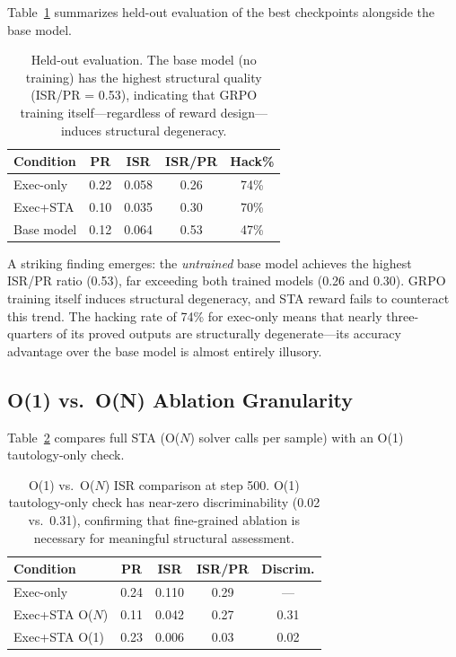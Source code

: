 \documentclass[11pt,a4paper]{article}
\begin{document}
Table~\ref{tab:held-out} summarizes held-out evaluation of the best checkpoints alongside the base model.

\begin{table}[t]
\centering
\small
\begin{tabular}{lcccc}
\toprule
\textbf{Condition} & \textbf{PR} & \textbf{ISR} & \textbf{ISR/PR} & \textbf{Hack\%} \\
\midrule
Exec-only    & 0.22 & 0.058 & 0.26 & 74\% \\
Exec+STA     & 0.10 & 0.035 & 0.30 & 70\% \\
Base model   & 0.12 & 0.064 & 0.53 & 47\% \\
\bottomrule
\end{tabular}
\caption{Held-out evaluation. The base model (no training) has the highest structural quality (ISR/PR = 0.53), indicating that GRPO training itself---regardless of reward design---induces structural degeneracy.}
\label{tab:held-out}
\end{table}

A striking finding emerges: the \emph{untrained} base model achieves the highest ISR/PR ratio (0.53), far exceeding both trained models (0.26 and 0.30).
GRPO training itself induces structural degeneracy, and STA reward fails to counteract this trend.
The hacking rate of 74\% for exec-only means that nearly three-quarters of its proved outputs are structurally degenerate---its accuracy advantage over the base model is almost entirely illusory.

\subsection{O(1) vs.\ O(N) Ablation Granularity}
\label{sec:o1-on}

Table~\ref{tab:o1-on} compares full STA (O($N$) solver calls per sample) with an O(1) tautology-only check.

\begin{table}[t]
\centering
\small
\begin{tabular}{lcccc}
\toprule
\textbf{Condition} & \textbf{PR} & \textbf{ISR} & \textbf{ISR/PR} & \textbf{Discrim.} \\
\midrule
Exec-only      & 0.24 & 0.110 & 0.29 & --- \\
Exec+STA O($N$)& 0.11 & 0.042 & 0.27 & 0.31 \\
Exec+STA O(1)  & 0.23 & 0.006 & 0.03 & 0.02 \\
\bottomrule
\end{tabular}
\caption{O(1) vs.\ O($N$) ISR comparison at step 500. O(1) tautology-only check has near-zero discriminability (0.02 vs.\ 0.31), confirming that fine-grained ablation is necessary for meaningful structural assessment.}
\label{tab:o1-on}
\end{table}
\end{document}
